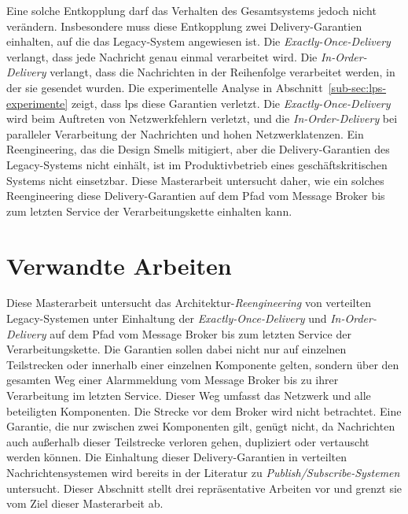 \newpage

Eine solche Entkopplung darf das Verhalten des Gesamtsystems jedoch nicht verändern. Insbesondere muss diese Entkopplung zwei Delivery-Garantien einhalten, auf die das Legacy-System angewiesen ist. Die \textit{Exactly-Once-Delivery} verlangt, dass jede Nachricht genau einmal verarbeitet wird. Die \textit{In-Order-Delivery} verlangt, dass die Nachrichten in der Reihenfolge verarbeitet werden, in der sie gesendet wurden. Die experimentelle Analyse in Abschnitt~\ref{sub-sec:lps-experimente} zeigt, dass \gls{lps} diese Garantien verletzt. Die \textit{Exactly-Once-Delivery} wird beim Auftreten von Netzwerkfehlern verletzt, und die \textit{In-Order-Delivery} bei paralleler Verarbeitung der Nachrichten und hohen Netzwerklatenzen. Ein Reengineering, das die Design Smells mitigiert, aber die Delivery-Garantien des Legacy-Systems nicht einhält, ist im Produktivbetrieb eines geschäftskritischen Systems nicht einsetzbar. Diese Masterarbeit untersucht daher, wie ein solches Reengineering diese Delivery-Garantien auf dem Pfad vom Message Broker bis zum letzten Service der Verarbeitungskette einhalten kann.

\section{Verwandte Arbeiten}
\label{sec:related}

Diese Masterarbeit untersucht das Architektur-\textit{Reengineering} von verteilten Legacy-Systemen unter Einhaltung der \textit{Exactly-Once-Delivery} und \textit{In-Order-Delivery} auf dem Pfad vom Message Broker bis zum letzten Service der Verarbeitungskette. Die Garantien sollen dabei nicht nur auf einzelnen Teilstrecken oder innerhalb einer einzelnen Komponente gelten, sondern über den gesamten Weg einer Alarmmeldung vom Message Broker bis zu ihrer Verarbeitung im letzten Service. Dieser Weg umfasst das Netzwerk und alle beteiligten Komponenten. Die Strecke vor dem Broker wird nicht betrachtet. Eine Garantie, die nur zwischen zwei Komponenten gilt, genügt nicht, da Nachrichten auch außerhalb dieser Teilstrecke verloren gehen, dupliziert oder vertauscht werden können. Die Einhaltung dieser Delivery-Garantien in verteilten Nachrichtensystemen wird bereits in der Literatur zu \textit{Publish/Subscribe-Systemen} untersucht. Dieser Abschnitt stellt drei repräsentative Arbeiten vor und grenzt sie vom Ziel dieser Masterarbeit ab.

